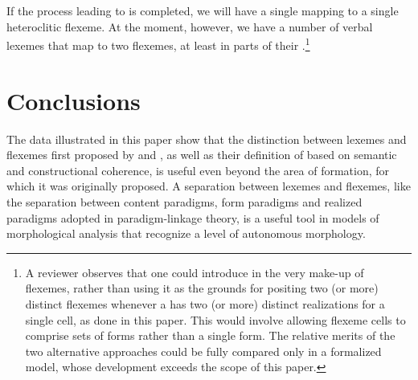 \documentclass[output=paper]{langsci/langscibook}
\begin{document}
If the process leading to  is completed, we will have a
single  mapping to a single heteroclitic flexeme. At the moment,
however, we have a number of  verbal lexemes that map to two
flexemes, at least in parts of their .\footnote{A reviewer
  observes that one could introduce  in the very make-up of
  flexemes, rather than using it as the grounds for positing two (or
  more) distinct flexemes whenever a  has two (or more) distinct
  realizations for a single cell, as done in this paper. This would
  involve allowing flexeme cells to comprise sets of forms rather than a
  single form. The relative merits of the two alternative approaches
  could be fully compared only in a formalized model, whose development
  exceeds the scope of this paper.}

\section{Conclusions}\label{conclusions}

The data illustrated in this paper show that the distinction between
lexemes and flexemes first proposed by %
\citet{Fradin03b} %
%
and
%
\citet{Fradin2003}%
%
, as well as their definition of  based on semantic
and constructional coherence, is useful even beyond the area of 
formation, for which it was originally proposed. A separation between
lexemes and flexemes, like the separation between content paradigms,
form paradigms and realized paradigms adopted in paradigm-linkage
theory, is a useful tool in models of morphological analysis that
recognize a level of autonomous morphology.



\nocite{laRepubblica}



{\sloppy
    \printbibliography[heading=subbibliography,notkeyword=this]
}
\end{document}

